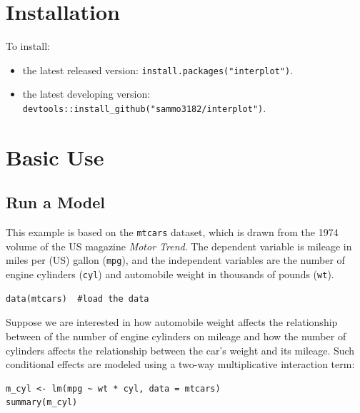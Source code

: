 \documentclass[
  article]{jss}
\begin{document}
\hypertarget{sec-installation}{%
\section{Installation}\label{sec-installation}}

To install:

\begin{itemize}
\item
  the latest released version: \texttt{install.packages("interplot")}.
\item
  the latest developing version:
  \texttt{devtools::install\_github("sammo3182/interplot")}.
\end{itemize}

\hypertarget{sec-basic-use}{%
\section{Basic Use}\label{sec-basic-use}}

\hypertarget{sec-run-a-model}{%
\subsection{Run a Model}\label{sec-run-a-model}}

This example is based on the \texttt{mtcars} dataset, which is drawn
from the 1974 volume of the US magazine \emph{Motor Trend}. The
dependent variable is mileage in miles per (US) gallon (\texttt{mpg}),
and the independent variables are the number of engine cylinders
(\texttt{cyl}) and automobile weight in thousands of pounds
(\texttt{wt}).

\begin{verbatim}
data(mtcars)  #load the data
\end{verbatim}

Suppose we are interested in how automobile weight affects the
relationship between of the number of engine cylinders on mileage and
how the number of cylinders affects the relationship between the car's
weight and its mileage. Such conditional effects are modeled using a
two-way multiplicative interaction term:

\begin{verbatim}
m_cyl <- lm(mpg ~ wt * cyl, data = mtcars)
summary(m_cyl)
\end{verbatim}
\end{document}
